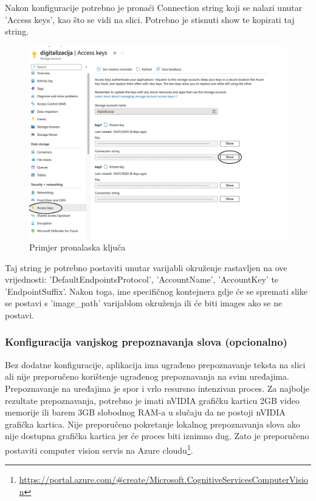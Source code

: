 			{Nakon konfiguracije potrebno je pronaći Connection string koji se nalazi unutar 'Access keys', kao što se vidi na slici. Potrebno je stisnuti show te kopirati taj string.}
			
			\begin{figure}[H]
				\includegraphics[width=\textwidth]{slike/accessKey.png}
				\caption{Primjer pronalaska ključa}
				\label{fig:accessKey}
			\end{figure}
			
			{Taj string je potrebno postaviti unutar varijabli okruženje rastavljen na ove vrijednosti: 'DefaultEndpointsProtocol', 'AccountName', 'AccountKey' te 'EndpointSuffix'. Nakon toga, ime specifičnog kontejnera gdje će se spremati slike se postavi s 'image\_path' varijablom okruženja ili će biti images ako se ne postavi.}
			
			\subsubsection{Konfiguracija vanjskog prepoznavanja slova (opcionalno)}
			
			{Bez dodatne konfiguracije, aplikacija ima ugrađeno prepoznavanje teksta na slici ali nije preporučeno korištenje ugrađenog prepoznavanja na svim uređajima. Prepoznavanje na uređajima je spor i vrlo resursno intenzivan proces. Za najbolje rezultate prepoznavanja, potrebno je imati nVIDIA grafičku karticu 2GB video memorije ili barem 3GB slobodnog RAM-a u slučaju da ne postoji nVIDIA grafička kartica. Nije preporučeno pokretanje lokalnog prepoznavanja slova ako nije dostupna grafička kartica jer će proces biti iznimno dug. Zato je preporučeno postaviti computer vision servis na Azure cloudu\footnote{\url{https://portal.azure.com/\#create/Microsoft.CognitiveServicesComputerVision}}.}
			
